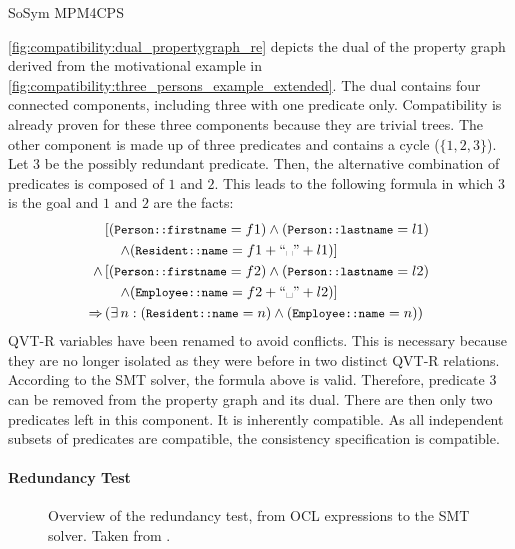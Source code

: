 \begin{copiedFrom}{SoSym MPM4CPS}
\begin{example}
\autoref{fig:compatibility:dual_propertygraph_re} depicts the dual of the property graph derived from the motivational example in \autoref{fig:compatibility:three_persons_example_extended}. The dual contains four connected components, including three with one predicate only. Compatibility is already proven for these three components because they are trivial trees. The other component is made up of three predicates and contains a cycle ($\{1, 2, 3\}$).
Let $3$ be the possibly redundant predicate. Then, the alternative combination of predicates is composed of $1$ and $2$. This leads to the following formula in which $3$ is the goal and $1$ and $2$ are the facts:
\begin{align*}
    &\left[(\propdisplay{\small Person::firstname} = f1) \wedge (\propdisplay{\small Person::lastname} = l1)\right.\\
    &\left.\formulaskip \wedge (\propdisplay{\small Resident::name} = f1 + ``\text{\textvisiblespace}" + l1)\right]\\
    \wedge & \left[(\propdisplay{\small Person::firstname} = f2) \wedge (\propdisplay{\small Person::lastname} = l2)\right.\\
    &\left.\formulaskip \wedge (\propdisplay{\small Employee::name} = f2 + ``\text{\textvisiblespace}" + l2)\right]\\
    \Rightarrow & \left(\exists n : (\propdisplay{\small Resident::name} = n) \wedge (\propdisplay{\small Employee::name} = n)\right)
\end{align*}
QVT-R variables have been renamed to avoid conflicts. This is necessary because they are no longer isolated as they were before in two distinct QVT-R relations. According to the SMT solver, the formula above is valid. Therefore, predicate $3$ can be removed from the property graph and its dual. There are then only two predicates left in this component. It is inherently compatible. As all independent subsets of predicates are compatible, the consistency specification is compatible.
\end{example}
    
\paragraph{Redundancy Test}

\begin{figure*}
    \centering
    \resizebox{\linewidth}{!}{}
    \caption[Redundancy test overview]{Overview of the redundancy test, from OCL expressions to the SMT solver. Taken from .}
    \label{fig:compatibility:redundancytest}
\end{figure*}


\end{copiedFrom}
